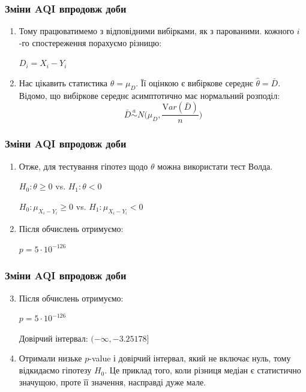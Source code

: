 \documentclass{beamer}
\begin{document}
\begin{frame}[fragile=singleslide]
  \frametitle{Зміни AQI впродовж доби}

  \begin{enumerate}
    \item Тому працюватимемо з відповідними вибірками, як з парованими. 
    кожного $i$-го спостереження порахуємо різницю:
  
    $D_i = X_i - Y_i$

    \item Нас цікавить статистика $\theta = \mu_D$. Її оцінкою є вибіркове 
    середнє $\hat{\theta} = \bar{D}$. Відомо, що вибіркове середнє асимптотично 
    має нормальний розподіл:
    $$ \bar{D} \overset{a}{\sim} N \bigg(\mu_D, \dfrac{{\mathrm Var}(\bar{D})}{n} \bigg) $$
    
  \end{enumerate}
\end{frame}

\begin{frame}[fragile=singleslide]
  \frametitle{Зміни AQI впродовж доби}

  \begin{enumerate}
    \item Отже, для тестування гіпотез щодо $\theta$ можна використати тест Волда.

    $H_0: \theta \ge 0$ vs. $H_1: \theta < 0$
  
    $H_0: \mu_{X_i - Y_i} \ge 0$ vs. $H_1: \mu_{X_i - Y_i} < 0$

    \item Після обчислень отримуємо:
    
    $ p = 5 \cdot 10^{-126} $
  \end{enumerate}
\end{frame}

\begin{frame}
  \frametitle{Зміни AQI впродовж доби}

  \begin{enumerate}
    \setcounter{enumi}{2}

    \item Після обчислень отримуємо:
    
    $ p = 5 \cdot 10^{-126} $

    Довірчий інтервал: $ (- \infty, -3.25178] $

    \item Отримали низьке $p$-value і довірчий інтервал, який не включає нуль, 
    тому відкидаємо гіпотезу $H_0$. Це приклад того, коли різниця медіан є 
    статистично значущою, проте її значення, насправді дуже мале.
  \end{enumerate}
\end{frame}
\end{document}
